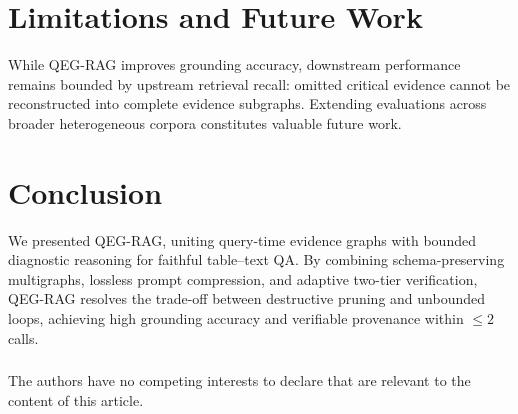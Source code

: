 \documentclass[runningheads]{llncs}
\begin{document}
\vspace{-2.5mm}
\section{Limitations and Future Work}
\label{sec:limitations}
\enlargethispage{5.0\baselineskip}
\vspace{-1mm}
While QEG-RAG improves grounding accuracy, downstream performance remains bounded by upstream retrieval recall: omitted critical evidence cannot be reconstructed into complete evidence subgraphs. Extending evaluations across broader heterogeneous corpora constitutes valuable future work.

\vspace{-2.5mm}
\section{Conclusion}
\label{sec:conclusion}
\vspace{-1mm}
We presented QEG-RAG, uniting query-time evidence graphs with bounded diagnostic reasoning for faithful table--text QA. By combining schema-preserving multigraphs, lossless prompt compression, and adaptive two-tier verification, QEG-RAG resolves the trade-off between destructive pruning and unbounded loops, achieving high grounding accuracy and verifiable provenance within $\le 2$ calls.

\vspace{-3mm}
\begin{credits}
\vspace{-1mm}
\subsubsection{\discintname}
The authors have no competing interests to declare that are relevant to the content of this article.
\end{credits}

\makeatletter
\renewenvironment{thebibliography}[1]
     {\section*{\refname}%
      \def\@biblabel##1{##1.}%
      \fontsize{5.8pt}{6.7pt}\selectfont
      \list{\@biblabel{\@arabic\c@enumiv}}%
           {\settowidth\labelwidth{\@biblabel{#1}}%
            \leftmargin\labelwidth
            \advance\leftmargin\labelsep
            \setlength{\itemsep}{-1.5pt plus 0.1pt}%
            \setlength{\parsep}{0pt}%
            \setlength{\topsep}{0.5pt}%
            \usecounter{enumiv}%
            \let\p@enumiv\@empty
            \renewcommand\theenumiv{\@arabic\c@enumiv}}%
      \renewcommand\newblock{\hskip .11em \@plus.33em \@minus.07em}%
      \sloppy\clubpenalty4000\widowpenalty4000%
      \sfcode`\.=1000\relax}
     {\def\@noitemerr
       {\@latex@warning{Empty `thebibliography' environment}}%
      \endlist}
\makeatother


\end{document}

